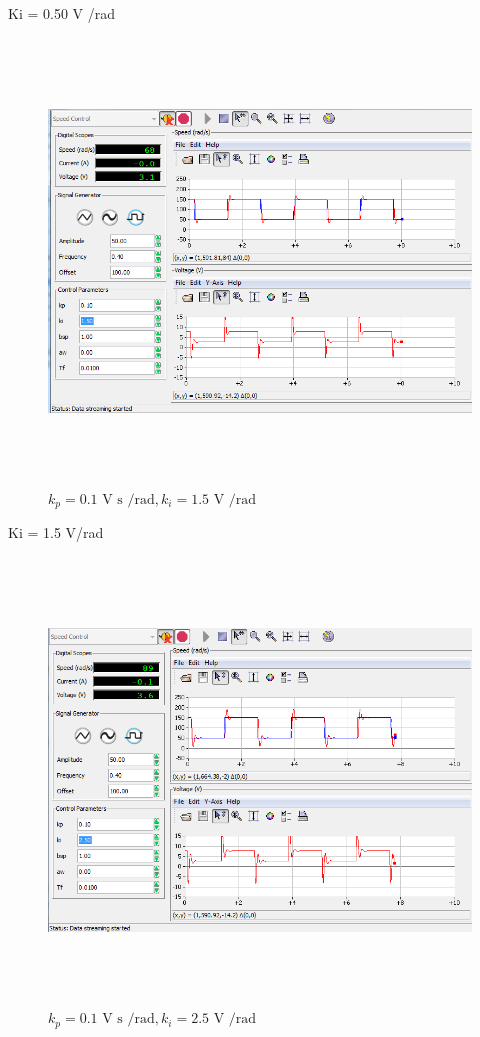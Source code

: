 \documentclass[]{article}
\begin{document}
Ki = 0.50 V /rad

\begin{figure}\includegraphics[width=6.50000in,height=4.65278in]{media/image58.png} \caption{$k_p = \text{0.1 V s /rad}, k_i = \text{1.5 V /rad}$} \end{figure}

Ki = 1.5 V/rad

\begin{figure}\includegraphics[width=6.50000in,height=4.65278in]{media/image14.png} \caption{$k_p = \text{0.1 V s /rad}, k_i = \text{2.5 V /rad}$} \end{figure}
\end{document}
